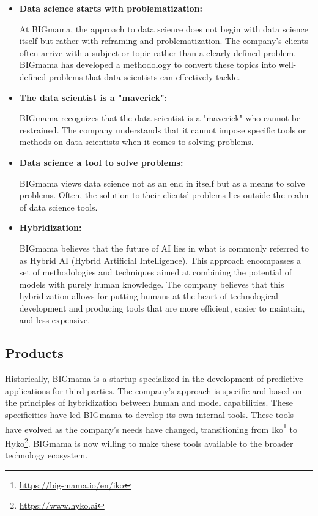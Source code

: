 \begin{itemize}
    \item \textbf{Data science starts with problematization:}

          At BIGmama, the approach to data science does not begin with data science itself but rather with reframing and problematization. The company's clients often arrive with a subject or topic rather than a clearly defined problem. BIGmama has developed a methodology to convert these topics into well-defined problems that data scientists can effectively tackle.

    \item \textbf{The data scientist is a "maverick":}

          BIGmama recognizes that the data scientist is a "maverick" who cannot be restrained. The company understands that it cannot impose specific tools or methods on data scientists when it comes to solving problems.

    \item \textbf{Data science a tool to solve problems:}

          BIGmama views data science not as an end in itself but as a means to solve problems. Often, the solution to their clients' problems lies outside the realm of data science tools.


    \item \textbf{Hybridization:}

          BIGmama believes that the future of AI lies in what is commonly referred to as Hybrid AI (Hybrid Artificial Intelligence). This approach encompasses a set of methodologies and techniques aimed at combining the potential of models with purely human knowledge. The company believes that this hybridization allows for putting humans at the heart of technological development and producing tools that are more efficient, easier to maintain, and less expensive.
\end{itemize}


\subsection{Products}

Historically, BIGmama is a startup specialized in the development of predictive applications for third parties. The company's approach is specific and based on the principles of hybridization between human and model capabilities. These \hyperref[specificities]{specificities} have led BIGmama to develop its own internal tools. These tools have evolved as the company's needs have changed, transitioning from Iko\footnote{\url{https://big-mama.io/en/iko}} to Hyko\footnote{\url{https://www.hyko.ai}}. BIGmama is now willing to make these tools available to the broader technology ecosystem.

